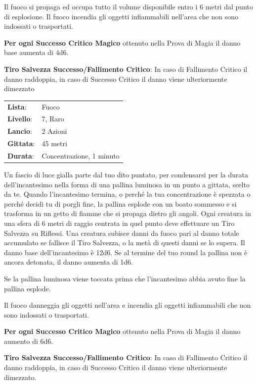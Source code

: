\begin{multicols}{2}
Il fuoco si propaga ed occupa tutto il volume disponibile entro i 6 metri dal punto di esplosione. Il fuoco incendia gli oggetti infiammabili nell'area che non sono indossati o trasportati.

\textbf{Per ogni Successo Critico Magico} ottenuto nella Prova di Magia il danno base aumenta di 4d6.

\textbf{Tiro Salvezza Successo/Fallimento Critico}: In caso di Fallimento Critico il danno raddoppia, in caso di Successo Critico il danno viene ulteriormente dimezzato

\noindent\begin{tabularx}{\linewidth}{p{1.3cm}X}
	\rowcolor{gray!20}\textbf{Lista}: & Fuoco \\
	\textbf{Livello}: & 7, Raro \\
	\rowcolor{gray!20}\textbf{Lancio}: & 2 Azioni \\
	\textbf{Gittata}: & 45 metri \\
	\rowcolor{gray!20}\textbf{Durata}: & Concentrazione, 1 minuto \\
\end{tabularx}\smallskip

Un fascio di luce gialla parte dal tuo dito puntato, per condensarsi per la durata dell'incantesimo nella forma di una pallina luminosa in un punto a gittata, scelto da te. Quando l'incantesimo termina, o perché la tua concentrazione è spezzata o perché decidi tu di porgli fine, la pallina esplode con un boato sommesso e si trasforma in un getto di fiamme che si propaga dietro gli angoli. Ogni creatura in una sfera di 6 metri di raggio centrata in quel punto deve effettuare un Tiro Salvezza su Riflessi. Una creatura subisce danni da fuoco pari al danno totale accumulato se fallisce il Tiro Salvezza, o la metà di questi danni se lo supera. Il danno base dell'incantesimo è 12d6. Se al termine del tuo round la pallina non è ancora detonata, il danno aumenta di 1d6.

Se la pallina luminosa viene toccata prima che l'incantesimo abbia avuto fine la pallina esplode.

Il fuoco danneggia gli oggetti nell'area e incendia gli oggetti infiammabili che non sono indossati o trasportati.

\textbf{Per ogni Successo Critico Magico} ottenuto nella Prova di Magia il danno aumento di 6d6.

\textbf{Tiro Salvezza Successo/Fallimento Critico}: In caso di Fallimento Critico il danno raddoppia, in caso di Successo Critico il danno viene ulteriormente dimezzato.


\end{multicols}
